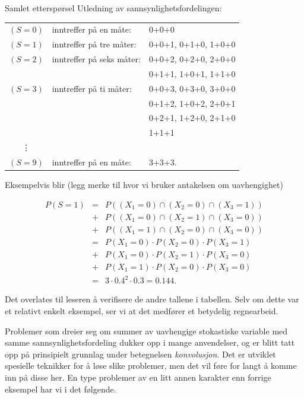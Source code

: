 \begin{eksempel}{Samlet etterspørsel}
\noindent Utledning av sannsynlighetsfordelingen:
\begin{center}
\begin{tabular}{cll}
 $(S=0)$ & inntreffer på en måte:   &  0+0+0 \\
 $(S=1)$ & inntreffer på tre måter: &  0+0+1, 0+1+0, 1+0+0 \\
 $(S=2)$ & inntreffer på seks måter:&  0+0+2, 0+2+0, 2+0+0 \\
       &                                    &  0+1+1, 1+0+1, 1+1+0 \\
 $(S=3)$ & inntreffer på ti måter:  &  0+0+3, 0+3+0, 3+0+0 \\
      &                                     & 0+1+2, 1+0+2, 2+0+1 \\
      &                                     & 0+2+1, 1+2+0, 2+1+0 \\
      &                                     & 1+1+1              \\
   \vdots &                                 &                     \\  
 $(S=9)$& inntreffer på en måte:    & 3+3+3.
\end{tabular}
\end{center}
\noindent Eksempelvis blir (legg merke til hvor vi bruker antakelsen om
uavhengighet)

\begin{eqnarray*}
     P(S=1)&=&P((X_1=0)\cap (X_2=0)\cap (X_3=1)) \\
           &+&P((X_1=0)\cap (X_2=1)\cap (X_3=0))\\
           &+&P((X_1=1)\cap (X_2=0)\cap (X_3=0)) \\
           &=&P(X_1=0)\cdot P(X_2=0)\cdot P(X_3=1) \\
           &+&P(X_1=0)\cdot P(X_2=1)\cdot P(X_3=0) \\
           &+&P(X_1=1)\cdot P(X_2=0)\cdot P(X_3=0) \\
           &=&3\cdot 0.4^2\cdot 0.3=0.144.
\end{eqnarray*}

\noindent Det overlates til leseren å verifisere de andre tallene i
tabellen. Selv om dette var et relativt enkelt eksempel, ser vi
at det medfører et betydelig regnearbeid.
\end{eksempel}

Problemer som dreier seg om summer av uavhengige stokastiske
variable med samme sannsynlighetsfordeling dukker opp i mange
anvendelser, og er blitt tatt opp på prinsipielt grunnlag under
betegnelsen {\em konvolusjon}. Det er utviklet spesielle
teknikker for å løse slike problemer, men det vil føre for langt
å komme inn på disse her.
En type problemer av en litt annen karakter enn forrige eksempel
har vi i det følgende.\\



